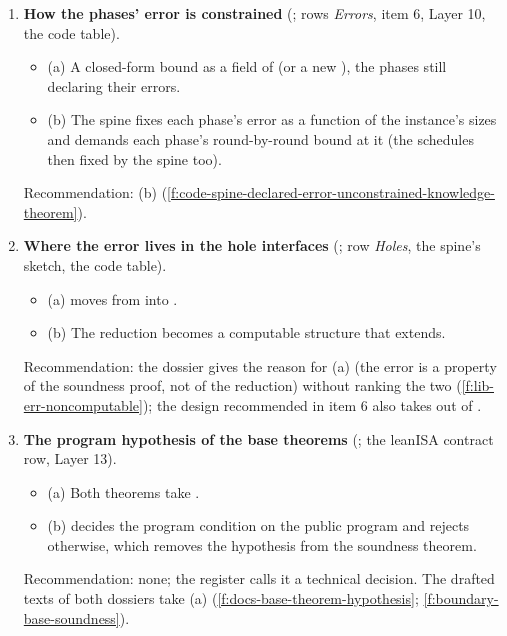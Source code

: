 \begin{enumerate}[leftmargin=*, itemsep=6pt]
\item \textbf{How the phases' error is constrained} (; rows \emph{Errors}, item 6, Layer
  10, the code table).
  \begin{itemize}[label={}, leftmargin=1.2em]
  \item (a) A closed-form bound as a field of  (or a new ),
    the phases still declaring their errors.
  \item (b) The spine fixes each phase's error as a function  of the instance's
    sizes and demands each phase's round-by-round bound at it (the schedules then fixed by the
    spine too).
  \end{itemize}
  Recommendation: (b) (\cref{f:code-spine-declared-error-unconstrained-knowledge-theorem}).

\item \textbf{Where the error lives in the hole interfaces} (; row \emph{Holes}, the
  spine's sketch, the code table).
  \begin{itemize}[label={}, leftmargin=1.2em]
  \item (a)  moves from  into .
  \item (b) The reduction becomes a computable structure that  extends.
  \end{itemize}
  Recommendation: the dossier gives the reason for (a) (the error is a property of the soundness
  proof, not of the reduction) without ranking the two (\cref{f:lib-err-noncomputable}); the design
  recommended in item 6 also takes  out of .

\item \textbf{The program hypothesis of the base theorems} (; the leanISA contract row,
  Layer 13).
  \begin{itemize}[label={}, leftmargin=1.2em]
  \item (a) Both theorems take .
  \item (b)  decides the program condition on the public program and rejects
    otherwise, which removes the hypothesis from the soundness theorem.
  \end{itemize}
  Recommendation: none; the register calls it a technical decision. The drafted texts of both
  dossiers take (a) (\cref{f:docs-base-theorem-hypothesis}; \cref{f:boundary-base-soundness}).


\end{enumerate}
